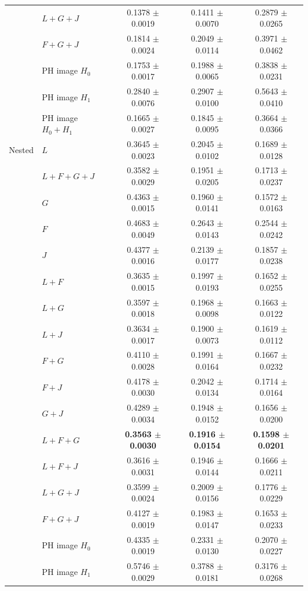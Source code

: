 \documentclass[10pt,a4paper]{article}
\newcommand{\B}[1]{\textbf{#1}}
\begin{document}
\begin{longtable}{@{}ll ccc@{}}
 & $L{+}G{+}J$ & 0.1378 $\pm$ 0.0019 & 0.1411 $\pm$ 0.0070 & 0.2879 $\pm$ 0.0265\\
 & $F{+}G{+}J$ & 0.1814 $\pm$ 0.0024 & 0.2049 $\pm$ 0.0114 & 0.3971 $\pm$ 0.0462\\
 & PH image $H_0$ & 0.1753 $\pm$ 0.0017 & 0.1988 $\pm$ 0.0065 & 0.3838 $\pm$ 0.0231\\
 & PH image $H_1$ & 0.2840 $\pm$ 0.0076 & 0.2907 $\pm$ 0.0100 & 0.5643 $\pm$ 0.0410\\
 & PH image $H_0{+}H_1$ & 0.1665 $\pm$ 0.0027 & 0.1845 $\pm$ 0.0095 & 0.3664 $\pm$ 0.0366\\
\midrule
Nested & $L$ & 0.3645 $\pm$ 0.0023 & 0.2045 $\pm$ 0.0102 & 0.1689 $\pm$ 0.0128\\
 & $L{+}F{+}G{+}J$ & 0.3582 $\pm$ 0.0029 & 0.1951 $\pm$ 0.0205 & 0.1713 $\pm$ 0.0237\\
 & $G$ & 0.4363 $\pm$ 0.0015 & 0.1960 $\pm$ 0.0141 & 0.1572 $\pm$ 0.0163\\
 & $F$ & 0.4683 $\pm$ 0.0049 & 0.2643 $\pm$ 0.0143 & 0.2544 $\pm$ 0.0242\\
 & $J$ & 0.4377 $\pm$ 0.0016 & 0.2139 $\pm$ 0.0177 & 0.1857 $\pm$ 0.0238\\
 & $L{+}F$ & 0.3635 $\pm$ 0.0015 & 0.1997 $\pm$ 0.0193 & 0.1652 $\pm$ 0.0255\\
 & $L{+}G$ & 0.3597 $\pm$ 0.0018 & 0.1968 $\pm$ 0.0098 & 0.1663 $\pm$ 0.0122\\
 & $L{+}J$ & 0.3634 $\pm$ 0.0017 & 0.1900 $\pm$ 0.0073 & 0.1619 $\pm$ 0.0112\\
 & $F{+}G$ & 0.4110 $\pm$ 0.0028 & 0.1991 $\pm$ 0.0164 & 0.1667 $\pm$ 0.0232\\
 & $F{+}J$ & 0.4178 $\pm$ 0.0030 & 0.2042 $\pm$ 0.0134 & 0.1714 $\pm$ 0.0164\\
 & $G{+}J$ & 0.4289 $\pm$ 0.0034 & 0.1948 $\pm$ 0.0152 & 0.1656 $\pm$ 0.0200\\
 & \B{$L{+}F{+}G$} & \B{0.3563 $\pm$ 0.0030} & \B{0.1916 $\pm$ 0.0154} & \B{0.1598 $\pm$ 0.0201}\\
 & $L{+}F{+}J$ & 0.3616 $\pm$ 0.0031 & 0.1946 $\pm$ 0.0144 & 0.1666 $\pm$ 0.0211\\
 & $L{+}G{+}J$ & 0.3599 $\pm$ 0.0024 & 0.2009 $\pm$ 0.0156 & 0.1776 $\pm$ 0.0229\\
 & $F{+}G{+}J$ & 0.4127 $\pm$ 0.0019 & 0.1983 $\pm$ 0.0147 & 0.1653 $\pm$ 0.0233\\
 & PH image $H_0$ & 0.4335 $\pm$ 0.0019 & 0.2331 $\pm$ 0.0130 & 0.2070 $\pm$ 0.0227\\
 & PH image $H_1$ & 0.5746 $\pm$ 0.0029 & 0.3788 $\pm$ 0.0181 & 0.3176 $\pm$ 0.0268\\

\end{longtable}
\end{document}
